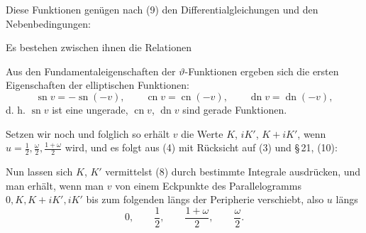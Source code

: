 
Diese Funktionen genügen nach (9) den Differentialgleichungen
und den Nebenbedingungen:

Es bestehen zwischen ihnen die Relationen

Aus den Fundamentaleigenschaften der $\vartheta$-Funktionen ergeben
sich die ersten Eigenschaften der elliptischen Funktionen:
\[
\operatorname{sn}v = -\operatorname{sn}(-v), \qquad \operatorname{cn}v = \operatorname{cn}(-v), \qquad \operatorname{dn}v = \operatorname{dn}(-v),
\]
d. h. $\operatorname{sn}v$ ist eine ungerade, $\operatorname{cn}v$, $\operatorname{dn}v$ sind gerade Funktionen.

Setzen wir noch
und folglich
so erhält $v$ die Werte $K$, $iK'$, $K+iK'$, wenn $u = \frac{1}{2}, \frac{\omega}{2}, \frac{1+\omega}{2}$ wird, und es folgt aus (4) mit Rücksicht auf (3) und \S\,21, (10):

Nun lassen sich $K$, $K'$ vermittelst (8) durch bestimmte Integrale
ausdrücken, und man erhält, wenn man $v$ von einem Eckpunkte des
Parallelogramms $0, K, K+iK', iK'$ bis zum folgenden längs der
Peripherie verschiebt, also $u$ längs
\[
0, \qquad \frac{1}{2}, \qquad \frac{1+\omega}{2}, \qquad \frac{\omega}{2}.
\]
